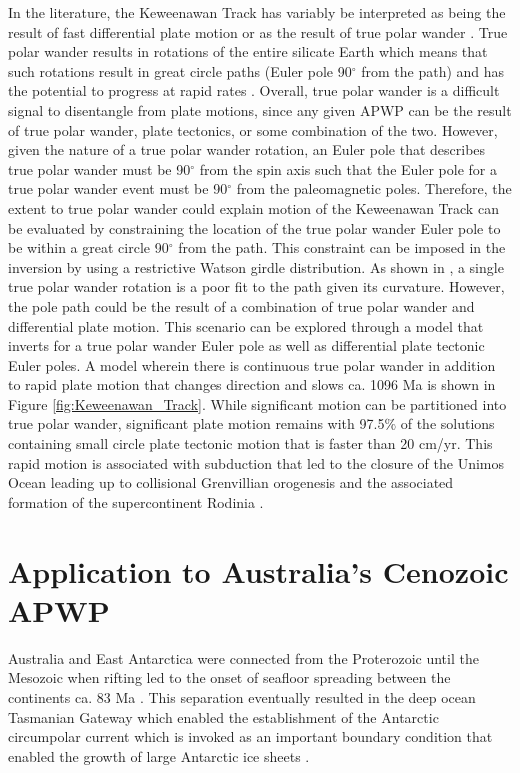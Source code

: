 \documentclass[11pt,letterpaper]{article}
\begin{document}
In the literature, the Keweenawan Track has variably be interpreted as being the result of fast differential plate motion \citep[e.g.][]{Davis1997a} or as the result of true polar wander \citep[e.g.][]{Evans2003b}. True polar wander results in rotations of the entire silicate Earth which means that such rotations result in great circle paths (Euler pole 90$^\circ$ from the path) and has the potential to progress at rapid rates \citep{Rose2017b}. Overall, true polar wander is a difficult signal to disentangle from plate motions, since any given APWP can be the result of true polar wander, plate tectonics, or some combination of the two. However, given the nature of a true polar wander rotation, an Euler pole that describes true polar wander must be 90$^\circ$ from the spin axis such that the Euler pole for a true polar wander event must be 90$^\circ$ from the paleomagnetic poles. Therefore, the extent to true polar wander could explain motion of the Keweenawan Track can be evaluated by constraining the location of the true polar wander Euler pole to be within a great circle 90$^\circ$ from the path. This constraint can be imposed in the inversion by using a restrictive Watson girdle distribution. As shown in \cite{Swanson-Hysell2019a}, a single true polar wander rotation is a poor fit to the path given its curvature. However, the pole path could be the result of a combination of true polar wander and differential plate motion. This scenario can be explored through a model that inverts for a true polar wander Euler pole as well as differential plate tectonic Euler poles. A model wherein there is continuous true polar wander in addition to rapid plate motion that changes direction and slows ca. 1096 Ma is shown in Figure \ref{fig:Keweenawan_Track}. While significant motion can be partitioned into true polar wander, significant plate motion remains with 97.5$\%$ of the solutions containing small circle plate tectonic motion that is faster than 20 cm/yr. This rapid motion is associated with subduction that led to the closure of the Unimos Ocean leading up to collisional Grenvillian orogenesis and the associated formation of the supercontinent Rodinia \citep{Swanson-Hysell2021d}.

\section*{Application to Australia's Cenozoic APWP}
\label{sec:australia}

Australia and East Antarctica were connected from the Proterozoic until the Mesozoic when rifting led to the onset of seafloor spreading between the continents ca. 83 Ma \citep{Williams2011a, Veevers2012a}. This separation eventually resulted in the deep ocean Tasmanian Gateway which enabled the establishment of the Antarctic circumpolar current which is invoked as an important boundary condition that enabled the growth of large Antarctic ice sheets \citep{Stickley2004a}. 
\end{document}
